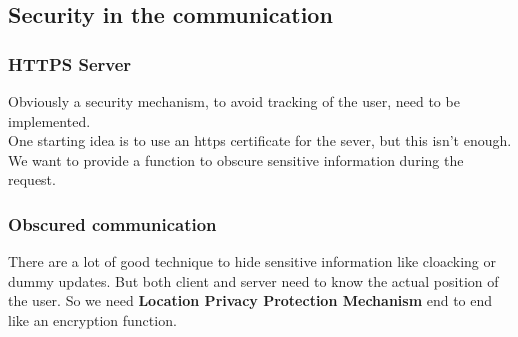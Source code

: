\documentclass[../../main]{subfiles}
\begin{document}
\label{ss:security-in-communication}
\subsection{Security in the communication}

\subsubsection{HTTPS Server}
Obviously a security mechanism, to avoid tracking of the user, need to be implemented.\\
One starting idea is to use an https certificate for the sever, but this isn't enough.
We want to provide a function to obscure sensitive information during the request.
\subsubsection{Obscured communication}
There are a lot of good technique to hide sensitive information like cloacking or dummy updates.
But both client and server need to know the actual position of the user. So we need \textbf{Location Privacy Protection Mechanism} end to end like an 
encryption function.
\end{document}
